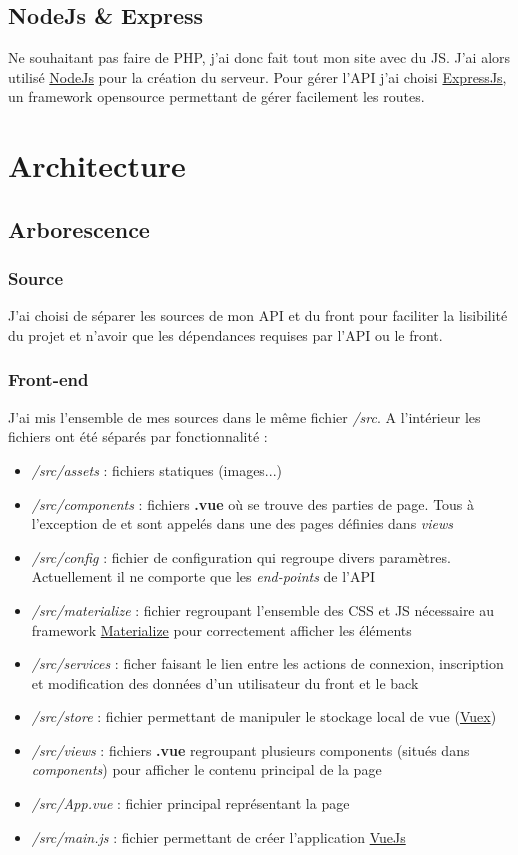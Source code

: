 \documentclass[english,12pt,a4paper]{report}
\newcommand{\ul}[1]{%
	\uline{\phantom{#1}}%
	\llap{\contour{white}{#1}}%
}
\begin{document}
\chapter{NodeJs \& Express}
Ne souhaitant pas faire de PHP, j'ai donc fait tout mon site avec du JS. J'ai alors utilisé \href{https://nodejs.org/en/}{NodeJs} pour la création du serveur. Pour gérer l'API j'ai choisi \href{https://expressjs.com/}{ExpressJs}, un framework opensource permettant de gérer facilement les routes.



\part{Architecture}
\chapter{Arborescence}
\section{Source}
J'ai choisi de séparer les sources de mon API et du front pour faciliter la lisibilité du projet et n'avoir que les dépendances requises par l'API ou le front.
\section{Front-end}
J'ai mis l'ensemble de mes sources dans le même fichier \textit{/src}. A l'intérieur les fichiers ont été séparés par fonctionnalité :
\begin{itemize}
	\item \textit{/src/assets} : fichiers statiques (images...)
	\item \textit{/src/components} : fichiers \textbf{.vue} où se trouve des parties de page. Tous à l'exception de \ul{Header.vue} et \ul{Footer.vue} sont appelés dans une des pages définies dans \textit{views}
	\item \textit{/src/config} : fichier de configuration qui regroupe divers paramètres. Actuellement il ne comporte que les \textit{end-points} de l'API
	\item \textit{/src/materialize} : fichier regroupant l'ensemble des CSS et JS nécessaire au framework \href{https://materializecss.com/}{Materialize} pour correctement afficher les éléments
	\item \textit{/src/services} : ficher faisant le lien entre les actions de connexion, inscription et modification des données d'un utilisateur du front et le back
	\item \textit{/src/store} : fichier permettant de manipuler le stockage local de vue (\href{https://vuex.vuejs.org/}{Vuex})
	\item \textit{/src/views} : fichiers \textbf{.vue} regroupant plusieurs components (situés dans \textit{components}) pour afficher le contenu principal de la page
	\item \textit{/src/App.vue} : fichier principal représentant la page
	\item \textit{/src/main.js} : fichier permettant de créer l'application \href{https://vuejs.org/}{VueJs}
\end{itemize}
\end{document}
